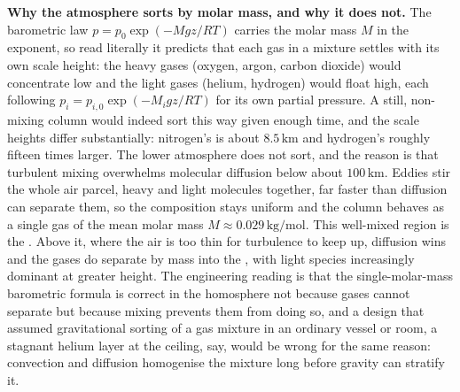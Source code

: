 \begin{mastery}
\textbf{Why the atmosphere sorts by molar mass, and why it does not.} The
barometric law $p=p_0\exp(-Mgz/RT)$ carries the molar mass $M$ in the
exponent, so read literally it predicts that each gas in a mixture settles
with its own scale height: the heavy gases (oxygen, argon, carbon dioxide)
would concentrate low and the light gases (helium, hydrogen) would float
high, each following $p_i=p_{i,0}\exp(-M_igz/RT)$ for its own partial
pressure. A still, non-mixing column would indeed sort this way given
enough time, and the scale heights differ substantially: nitrogen's is
about $8.5\,\si{\kilo\meter}$ and hydrogen's roughly fifteen times larger.
The lower atmosphere does not sort, and the reason is that turbulent mixing
overwhelms molecular diffusion below about $100\,\si{\kilo\meter}$. Eddies
stir the whole air parcel, heavy and light molecules together, far faster
than diffusion can separate them, so the composition stays uniform and the
column behaves as a single gas of the mean molar mass $M\approx 0.029\,\si{
\kilogram\per\mole}$. This well-mixed region is the .
Above it, where the air is too thin for turbulence to keep up, diffusion
wins and the gases do separate by mass into the ,
with light species increasingly dominant at greater height. The engineering
reading is that the single-molar-mass barometric formula is correct in the
homosphere not because gases cannot separate but because mixing prevents
them from doing so, and a design that assumed gravitational sorting of a
gas mixture in an ordinary vessel or room, a stagnant helium layer at the
ceiling, say, would be wrong for the same reason: convection and diffusion
homogenise the mixture long before gravity can stratify it.
\end{mastery}


